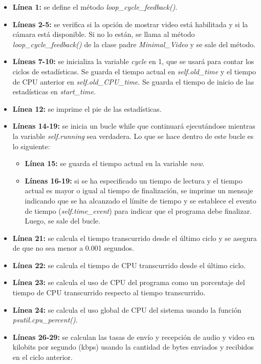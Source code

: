 \begin{itemize}
    \item \textbf{Línea 1:} se define el método \textit{loop\_cycle\_feedback()}.
    \item \textbf{Líneas 2-5:} se verifica si la opción de mostrar video está habilitada y si la cámara está disponible. Si no lo están, se llama al método \textit{loop\_cycle\_feedback()} de la clase padre \textit{Minimal\_Video} y se sale del método.
    \item \textbf{Líneas 7-10:} se inicializa la variable \textit{cycle} en 1, que se usará para contar los ciclos de estadísticas. Se guarda el tiempo actual en \textit{self.old\_time} y el tiempo de CPU anterior en \textit{self.old\_CPU\_time}. Se guarda el tiempo de inicio de las estadísticas en \textit{start\_time}.
    \item \textbf{Línea 12:} se imprime el pie de las estadísticas.
    \item \textbf{Líneas 14-19:} se inicia un bucle while que continuará ejecutándose mientras la variable \textit{self.running} sea verdadera. Lo que se hace dentro de este bucle es lo siguiente:
    \begin{itemize}
        \item \textbf{Línea 15:} se guarda el tiempo actual en la variable \textit{now}.
        \item \textbf{Líneas 16-19:} si se ha especificado un tiempo de lectura y el tiempo actual es mayor o igual al tiempo de finalización, se imprime un mensaje indicando que se ha alcanzado el límite de tiempo y se establece el evento de tiempo (\textit{self.time\_event}) para indicar que el programa debe finalizar. Luego, se sale del bucle.
    \end{itemize}
    \item \textbf{Línea 21:} se calcula el tiempo transcurrido desde el último ciclo y se asegura de que no sea menor a 0.001 segundos.
    \item \textbf{Línea 22:} se calcula el tiempo de CPU transcurrido desde el último ciclo.
    \item \textbf{Línea 23:} se calcula el uso de CPU del programa como un porcentaje del tiempo de CPU transcurrido respecto al tiempo transcurrido.
    \item \textbf{Línea 24:} se calcula el uso global de CPU del sistema usando la función \textit{psutil.cpu\_percent()}.
    \item \textbf{Líneas 26-29:} se calculan las tasas de envío y recepción de audio y video en kilobits por segundo (kbps) usando la cantidad de bytes enviados y recibidos en el ciclo anterior.

\end{itemize}
